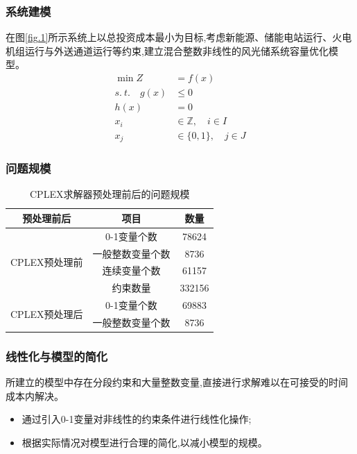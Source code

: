 \documentclass{beamer}
\begin{document}
\begin{frame}
	\frametitle{系统建模} 
	\qquad 在图\ref*{fig.1}所示系统上以总投资成本最小为目标,考虑新能源、储能电站运行、火电机组运行与外送通道运行等约束,建立混合整数非线性的风光储系统容量优化模型。
	\begin{align}
		\min Z&=f(x)\label{eq.1}\\
		s.\ t. \quad g(x) &\leq 0 \label{eq.2}\\
		h(x)&=0 \label{eq.3}\\
		x_i &\in \mathbb{Z},\quad  i \in I \label{eq.4}\\
		x_j &\in \{0,1\}, \quad j \in J \label{eq.5}
	\end{align}
\end{frame}

\begin{frame}
	\frametitle{问题规模}
	\begin{table}[htbp]
		\centering
		\caption{CPLEX求解器预处理前后的问题规模}
		\label{tab.1}
		\begin{tabular}{|c|c|c|}
		\hline
		预处理前后 & 项目 & 数量  \\ \hline
		\multirow{4}{*}{CPLEX预处理前}	& 0-1变量个数  		& 78624  \\ \cline{2-3} 
										& 一般整数变量个数 	& 8736   \\ \cline{2-3} 
								   		& 连续变量个数   	& 61157  \\ \cline{2-3} 
								   		& 约束数量			& 332156 \\ \hline
		\multirow{2}{*}{CPLEX预处理后} 	& 0-1变量个数		& 69883  \\ \cline{2-3} 
								   		& 一般整数变量个数 	& 8736   \\ \hline
		\end{tabular}
	\end{table}
\end{frame}

\begin{frame}
	\frametitle{线性化与模型的简化}
	\qquad 所建立的模型中存在分段约束和大量整数变量,直接进行求解难以在可接受的时间成本内解决。
	\begin{itemize}
		\item 通过引入0-1变量对非线性的约束条件进行线性化操作;
		\item 根据实际情况对模型进行合理的简化,以减小模型的规模。
	\end{itemize}
\end{frame}

\end{document}
